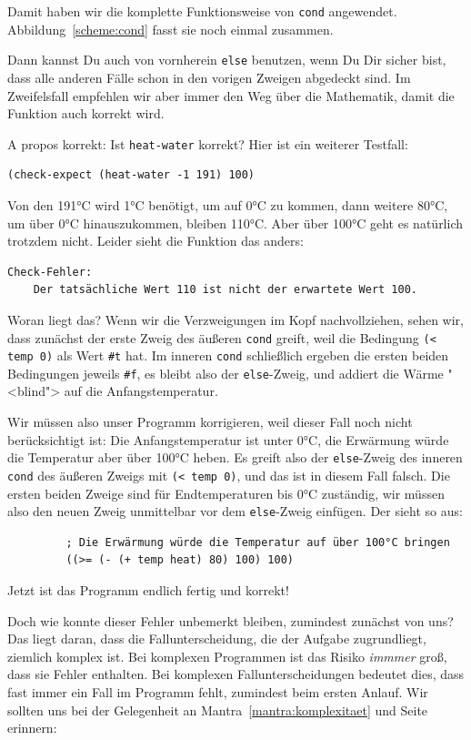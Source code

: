 %
Damit haben wir die komplette Funktionsweise von \texttt{cond}
angewendet. Abbildung~\ref{scheme:cond} fasst sie noch einmal zusammen.

Dann kannst Du auch von vornherein \texttt{else} benutzen, wenn Du Dir
sicher bist, dass alle anderen Fälle schon in den vorigen Zweigen
abgedeckt sind.  Im Zweifelsfall empfehlen wir aber immer den Weg über
die Mathematik, damit die Funktion auch korrekt wird.

A propos korrekt: Ist \texttt{heat-water} korrekt?  Hier ist ein
weiterer Testfall:
%
\begin{verbatim}
(check-expect (heat-water -1 191) 100)
\end{verbatim}
%
Von den 191°C wird 1°C benötigt, um auf 0°C zu kommen, dann weitere
80°C, um über 0°C hinauszukommen, bleiben 110°C.  Aber über 100°C geht
es natürlich trotzdem nicht.  Leider sieht die Funktion das anders:
%
\begin{verbatim}
Check-Fehler:
	Der tatsächliche Wert 110 ist nicht der erwartete Wert 100.
\end{verbatim}
%
Woran liegt das?  Wenn wir die Verzweigungen im Kopf nachvollziehen,
sehen wir, dass zunächst der erste Zweig des äußeren \texttt{cond}
greift, weil die Bedingung \verb|(< temp 0)| als Wert \verb|#t| hat.
Im inneren \texttt{cond} schließlich ergeben die ersten beiden
Bedingungen jeweils \verb|#f|, es bleibt also der \texttt{else}-Zweig,
und addiert die Wärme "<blind"> auf die Anfangstemperatur.

Wir müssen also unser Programm korrigieren, weil dieser Fall noch
nicht berücksichtigt ist: Die Anfangstemperatur ist unter 0°C, die
Erwärmung würde die Temperatur aber über 100°C heben.  Es greift also
der \texttt{else}-Zweig des inneren \texttt{cond} des äußeren Zweigs
mit \texttt{(< temp 0)}, und das ist in diesem Fall falsch.  Die
ersten beiden Zweige sind für Endtemperaturen bis 0°C zuständig, wir
müssen also den neuen Zweig unmittelbar vor dem \texttt{else}-Zweig
einfügen.  Der sieht so aus:
%
\begin{verbatim}
         ; Die Erwärmung würde die Temperatur auf über 100°C bringen
         ((>= (- (+ temp heat) 80) 100) 100)
\end{verbatim}
%
Jetzt ist das Programm endlich fertig und korrekt!

Doch wie konnte dieser Fehler unbemerkt bleiben, zumindest zunächst
von uns?  Das liegt daran, dass die Fallunterscheidung, die der
Aufgabe zugrundliegt, ziemlich komplex ist.  Bei komplexen Programmen
ist das Risiko \emph{immmer} groß, dass sie Fehler enthalten.  Bei
komplexen Fallunterscheidungen bedeutet dies, dass fast immer ein Fall
im Programm fehlt, zumindest beim ersten Anlauf.  Wir sollten uns bei
der Gelegenheit an Mantra~\ref{mantra:komplexitaet} und
Seite~\pageref{mantra:komplexitaet} erinnern:

